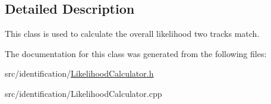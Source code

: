 \subsection{Detailed Description}
This class is used to calculate the overall likelihood two tracks match. 

The documentation for this class was generated from the following files\+:\begin{DoxyCompactItemize}
\item 
src/identification/\mbox{\hyperlink{_likelihood_calculator_8h}{Likelihood\+Calculator.\+h}}\item 
src/identification/Likelihood\+Calculator.\+cpp\end{DoxyCompactItemize}
